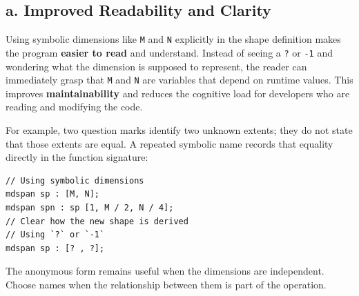 \subsection*{\textbf{a. Improved Readability and Clarity}}

Using symbolic dimensions like \texttt{M} and \texttt{N} explicitly in the shape definition makes the program \textbf{easier to read} and understand. Instead of seeing a \texttt{?} or \texttt{-1} and wondering what the dimension is supposed to represent, the reader can immediately grasp that \texttt{M} and \texttt{N} are variables that depend on runtime values. This improves \textbf{maintainability} and reduces the cognitive load for developers who are reading and modifying the code.

For example, two question marks identify two unknown extents; they do not state that those extents are equal. A repeated symbolic name records that equality directly in the function signature:

\begin{lstlisting}[language=croqtile,caption={a. Improved Readability and Clarity}]
// Using symbolic dimensions
mdspan sp : [M, N];
mdspan spn : sp [1, M / 2, N / 4];
// Clear how the new shape is derived
// Using `?` or `-1`
mdspan sp : [? , ?];
\end{lstlisting}

The anonymous form remains useful when the dimensions are independent. Choose names when the relationship between them is part of the operation.
